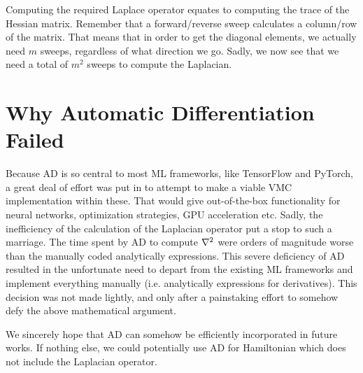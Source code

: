 \documentclass[Thesis.tex]{subfiles}
\begin{document}
Computing the required Laplace operator equates to computing the trace of the Hessian
matrix. Remember that a forward/reverse sweep calculates a column/row of the
matrix. That means that in order to get the diagonal elements, we actually need
$m$ sweeps, regardless of what direction we go. Sadly, we now see that we need a
total of $m^2$ sweeps to compute the Laplacian.


\section{Why Automatic Differentiation Failed}

Because AD is so central to most ML frameworks, like TensorFlow and PyTorch, a
great deal of effort was put in to attempt to make a viable VMC implementation
within these. That would give out-of-the-box functionality for neural networks,
optimization strategies, GPU acceleration etc. Sadly, the inefficiency of the
calculation of the Laplacian operator put a stop to such a marriage. The time
spent by AD to compute $\laplacian$ were orders of magnitude worse than the
manually coded analytically expressions. This severe deficiency of AD resulted
in the unfortunate need to depart from the existing ML frameworks and
implement everything manually (i.e. analytically expressions for derivatives).
This decision was not made lightly, and only after a painstaking effort to
somehow defy the above mathematical argument.

We sincerely hope that AD can somehow be efficiently incorporated in future
works. If nothing else, we could potentially use AD for Hamiltonian which does
not include the Laplacian operator. 
\end{document}

